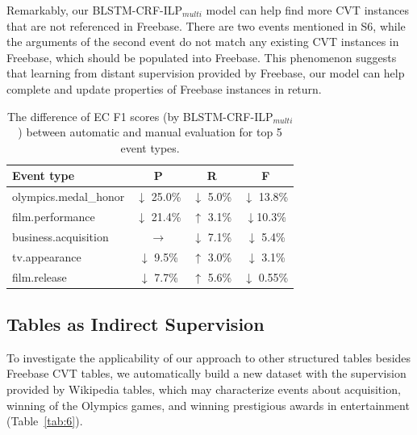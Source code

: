 Remarkably, our BLSTM-CRF-ILP$_{multi}$ model can help find more CVT instances that are not referenced in Freebase. There are two events mentioned in S6, while the arguments of the second event do not match any existing CVT instances in Freebase, which should be populated into Freebase. %
This phenomenon suggests that learning from distant supervision provided by Freebase, our model can help complete and update properties of Freebase instances in return.

\begin{table}[h]
\small
\centering
\begin{tabular}{|l|c|c|c|} \hline
	Event type & P & R & F \\ \hline
	olympics.medal\_honor%
	& $\downarrow$ 25.0\% & $\downarrow$ 5.0\% & $\downarrow$ 13.8\% \\ \hline
	film.performance & $\downarrow$ 21.4\% & $\uparrow$ 3.1\% & $\downarrow$10.3\% \\ \hline
	business.acquisition & $\rightarrow$ & $\downarrow$ 7.1\% & $\downarrow$ 5.4\% \\ \hline
	tv.appearance%
	& $\downarrow$ 9.5\% & $\uparrow$ 3.0\% & $\downarrow$ 3.1\% \\ \hline
	film.release%
	& $\downarrow$ 7.7\% & $\uparrow$ 5.6\% & $\downarrow$ 0.55\% \\ \hline
\end{tabular}
\caption{The difference of EC F1 scores (by BLSTM-CRF-ILP$_{multi}$) between automatic and manual evaluation for top 5 event types.\label{tab:4}}
\end{table}

\vspace{-.3em}
\subsection{Tables as Indirect Supervision}
To investigate the applicability of our approach to other structured tables besides Freebase CVT tables, %
we automatically build a new dataset with the supervision provided by Wikipedia tables, which may characterize events about acquisition, winning of the Olympics games, and winning prestigious awards in entertainment (Table~\ref{tab:6}). 

